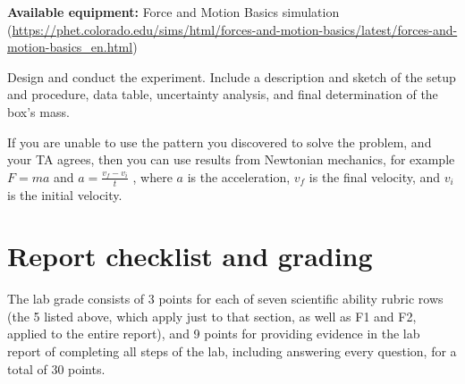 \textbf{Available equipment:} 
Force and Motion Basics simulation (\url{https://phet.colorado.edu/sims/html/forces-and-motion-basics/latest/forces-and-motion-basics_en.html})

\begin{steps}
	\item Design and conduct the experiment. Include a description and sketch of the setup and procedure, data table, uncertainty analysis, and final determination of the box's mass.
	
	If you are unable to use the pattern you discovered to solve the problem, and your TA agrees, then you can use results from Newtonian mechanics, for example $F = ma$ and $a = \frac{v_f - v_i}{t}$ , where $a$ is the acceleration, $v_f$ is the final velocity, and $v_i$ is the initial velocity.
\end{steps}

\section{Report checklist and grading}

The lab grade consists of 3 points for each of seven scientific ability rubric rows (the 5 listed above, which apply just to that section, as well as F1 and F2, applied to the entire report), and 9 points for providing evidence in the lab report of completing all steps of the lab, including answering every question, for a total of 30 points.